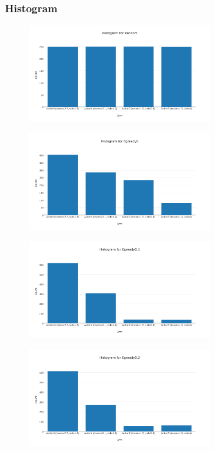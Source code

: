 \documentclass[11pt]{article}
\begin{document}
\subsubsection{Histogram}

\begin{figure}[H]
   \centering
   \includegraphics[width=0.7\textwidth]{img/1-2/h1.png}
\end{figure}

\begin{figure}[H]
   \centering
   \includegraphics[width=0.7\textwidth]{img/1-2/h2.png}
\end{figure}

\begin{figure}[H]
   \centering
   \includegraphics[width=0.7\textwidth]{img/1-2/h3.png}
\end{figure}

\begin{figure}[H]
   \centering
   \includegraphics[width=0.7\textwidth]{img/1-2/h4.png}
\end{figure}
\end{document}
